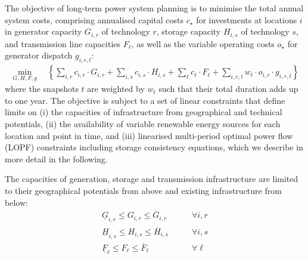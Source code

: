 The objective of long-term power system planning is to minimise the total annual
system costs, comprising annualised capital costs $c_\star$ for investments at
locations $i$ in generator capacity $G_{i,r}$ of technology $r$, storage
capacity $H_{i,s}$ of technology $s$, and transmission line capacities
$F_{\ell}$, as well as the variable operating costs $o_\star$ for generator
dispatch $g_{i,r,t}$:
\begin{align}
    \min_{G,H,F,g} \quad \left\{
        \sum_{i,r}   c_{i,r}  \cdot G_{i,r}  +
        \sum_{i,s}   c_{i,s}  \cdot H_{i,s}  +
        \sum_{\ell}  c_{\ell} \cdot F_{\ell} +
        \sum_{i,r,t} w_t \cdot o_{i,r} \cdot g_{i,r,t}
    \right\}
    \label{eq:objective}
\end{align}
where the snapshots $t$ are weighted by $w_t$ such that their total duration
adds up to one year. The objective is subject to a set of linear constraints
that define limits on (i) the capacities of infrastructure from geographical and
technical potentials, (ii) the availability of variable renewable energy sources
for each location and point in time, and (iii) linearised multi-period optimal
power flow (LOPF) constraints including storage consistency equations, which we
describe in more detail in the following.

The capacities of generation, storage and transmission infrastructure are
limited to their geographical potentials from above and existing infrastructure
from below:
\begin{align}
    \label{eq:firstA}
    \underline{G}_{i,r}  \leq G_{i,r}  \leq \overline{G}_{i,r}  &\qquad\forall i, r \\
    \underline{H}_{i,s}  \leq H_{i,s}  \leq \overline{H}_{i,s}  &\qquad\forall i, s \\
    \underline{F}_{\ell} \leq F_{\ell} \leq \overline{F}_{\ell} &\qquad\forall \ell
\end{align}

